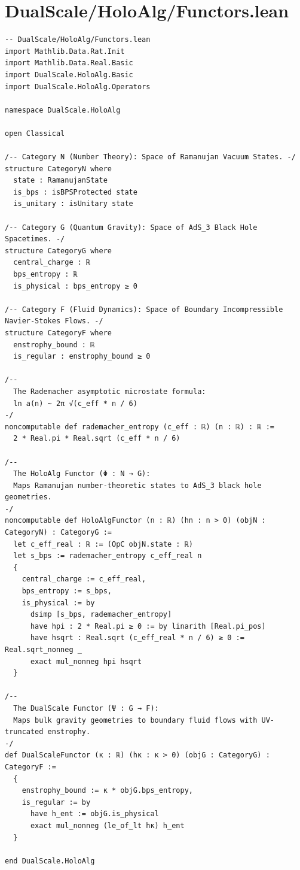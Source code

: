 \documentclass[11pt,twoside,openright]{book}
\begin{document}
\section{DualScale/HoloAlg/Functors.lean}
\begin{verbatim}
-- DualScale/HoloAlg/Functors.lean
import Mathlib.Data.Rat.Init
import Mathlib.Data.Real.Basic
import DualScale.HoloAlg.Basic
import DualScale.HoloAlg.Operators

namespace DualScale.HoloAlg

open Classical

/-- Category N (Number Theory): Space of Ramanujan Vacuum States. -/
structure CategoryN where
  state : RamanujanState
  is_bps : isBPSProtected state
  is_unitary : isUnitary state

/-- Category G (Quantum Gravity): Space of AdS_3 Black Hole Spacetimes. -/
structure CategoryG where
  central_charge : ℝ
  bps_entropy : ℝ
  is_physical : bps_entropy ≥ 0

/-- Category F (Fluid Dynamics): Space of Boundary Incompressible Navier-Stokes Flows. -/
structure CategoryF where
  enstrophy_bound : ℝ
  is_regular : enstrophy_bound ≥ 0

/-- 
  The Rademacher asymptotic microstate formula:
  ln a(n) ~ 2π √(c_eff * n / 6)
-/
noncomputable def rademacher_entropy (c_eff : ℝ) (n : ℝ) : ℝ :=
  2 * Real.pi * Real.sqrt (c_eff * n / 6)

/-- 
  The HoloAlg Functor (Φ : N → G):
  Maps Ramanujan number-theoretic states to AdS_3 black hole geometries.
-/
noncomputable def HoloAlgFunctor (n : ℝ) (hn : n > 0) (objN : CategoryN) : CategoryG :=
  let c_eff_real : ℝ := (OpC objN.state : ℝ)
  let s_bps := rademacher_entropy c_eff_real n
  {
    central_charge := c_eff_real,
    bps_entropy := s_bps,
    is_physical := by
      dsimp [s_bps, rademacher_entropy]
      have hpi : 2 * Real.pi ≥ 0 := by linarith [Real.pi_pos]
      have hsqrt : Real.sqrt (c_eff_real * n / 6) ≥ 0 := Real.sqrt_nonneg _
      exact mul_nonneg hpi hsqrt
  }

/-- 
  The DualScale Functor (Ψ : G → F):
  Maps bulk gravity geometries to boundary fluid flows with UV-truncated enstrophy.
-/
def DualScaleFunctor (κ : ℝ) (hκ : κ > 0) (objG : CategoryG) : CategoryF :=
  {
    enstrophy_bound := κ * objG.bps_entropy,
    is_regular := by
      have h_ent := objG.is_physical
      exact mul_nonneg (le_of_lt hκ) h_ent
  }

end DualScale.HoloAlg

\end{verbatim}
\end{document}
